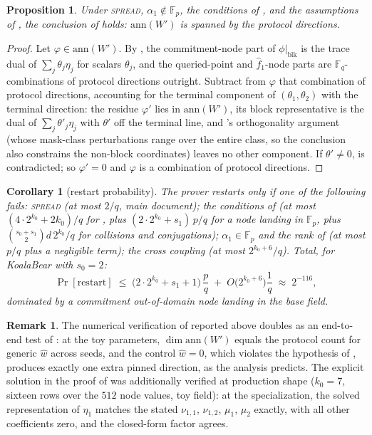 \documentclass{article}
\newcommand{\Fp}{\mathbb{F}_p}
\newcommand{\Fq}{\mathbb{F}_q}
\newcommand{\extdeg}{d}
\newtheorem{proposition}{Proposition}
\newtheorem{corollary}{Corollary}
\theoremstyle{definition}
\newtheorem{remark}{Remark}
\begin{document}
\begin{proposition}\label{prop:pinbound}
Under \textsc{spread}, $\alpha_1 \notin \Fp$, the conditions of , and the assumptions of , the conclusion of  holds: $\mathrm{ann}(W')$ is spanned by the protocol directions.
\end{proposition}

\begin{proof}
Let $\varphi \in \mathrm{ann}(W')$. By , the commitment-node part of $\phi|_{\mathrm{blk}}$ is the trace dual of $\sum_j \theta_j \eta_j$ for scalars $\theta_j$, and the queried-point and $\hat{f}_1$-node parts are $\Fq$-combinations of protocol directions outright. Subtract from $\varphi$ that combination of protocol directions, accounting for the terminal component of $(\theta_1, \theta_2)$ with the terminal direction: the residue $\varphi'$ lies in $\mathrm{ann}(W')$, its block representative is the dual of $\sum_j \theta'_j \eta_j$ with $\theta'$ off the terminal line, and 's orthogonality argument (whose mask-class perturbations range over the entire class, so the conclusion also constrains the non-block coordinates) leaves no other component. If $\theta' \neq 0$,  is contradicted; so $\varphi' = 0$ and $\varphi$ is a combination of protocol directions.
\end{proof}

\begin{corollary}[restart probability]\label{cor:restart}
The prover restarts only if one of the following fails: \textsc{spread} (at most $2/q$, main document); the conditions of  (at most $(4 \cdot 2^{k_0} + 2k_0)/q$ for , plus $(2 \cdot 2^{k_0} + s_1)\, p/q$ for a node landing in $\Fp$, plus $\binom{s_0 + s_1}{2} \extdeg\, 2^{k_0}/q$ for collisions and conjugations); $\alpha_1 \in \Fp$ and the rank of  (at most $p/q$ plus a negligible term); the cross coupling (at most $2^{k_0+6}/q$). Total, for KoalaBear with $s_0 = 2$:
\[
\Pr[\mathrm{restart}] \;\leq\; \big(2 \cdot 2^{k_0} + s_1 + 1\big)\, \frac{p}{q} \;+\; O\big(2^{k_0 + 6}\big)\frac{1}{q} \;\approx\; 2^{-116} ,
\]
dominated by a commitment out-of-domain node landing in the base field.
\end{corollary}

\begin{remark}
The numerical verification of  reported above doubles as an end-to-end test of : at the toy parameters, $\dim \mathrm{ann}(W')$ equals the protocol count for generic $\hat{w}$ across seeds, and the control $\hat{w} = 0$, which violates the hypothesis of , produces exactly one extra pinned direction, as the analysis predicts. The explicit solution in the proof of  was additionally verified at production shape ($k_0 = 7$, sixteen rows over the $512$ node values, toy field): at the specialization, the solved representation of $\eta_1$ matches the stated $\nu_{1,1}$, $\nu_{1,2}$, $\mu_1$, $\mu_2$ exactly, with all other coefficients zero, and the closed-form factor agrees.
\end{remark}
\end{document}
